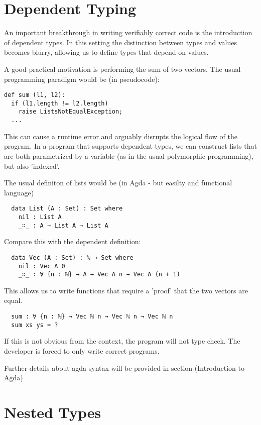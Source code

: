\documentclass[12pt,twoside,notitlepage]{report}
\begin{document}
\section{Dependent Typing}

An important breakthrough in writing verifiably correct code is the introduction of dependent types.\cite{achipala}
In this setting the distinction between types and values becomes blurry, allowing us to define types that depend on values.


A good practical motivation is performing the sum of two vectors. The usual programming paradigm would be (in pseudocode): \\

\begin{verbatim}
def sum (l1, l2):
  if (l1.length != l2.length)
    raise ListsNotEqualException;
  ...
\end{verbatim}

This can cause a runtime error and arguably disrupts the logical flow of the program. In a program that
supports dependent types, we can construct lists that are both parametrized by a variable (as in the usual
polymorphic programming), but also 'indexed'.

The usual definiton of lists would be (in Agda - but easilty and functional language)

\begin{verbatim}
  data List (A : Set) : Set where
    nil : List A
    _∷_ : A → List A → List A
 \end{verbatim}

Compare this with the dependent definition:

\begin{verbatim}
  data Vec (A : Set) : ℕ → Set where
    nil : Vec A 0
    _∷_ : ∀ {n : ℕ} → A → Vec A n → Vec A (n + 1)
\end{verbatim}

This allows us to write functions that require a 'proof' that the two vectors are equal.

\begin{verbatim}
  sum : ∀ {n : ℕ} → Vec ℕ n → Vec ℕ n → Vec ℕ n
  sum xs ys = ?
\end{verbatim}
If this is not obvious from the context, the program will not type check.
The developer is forced to only write correct programs.

Further details about agda syntax will be provided in section (Introduction to Agda)

\section{Nested Types}
\end{document}
